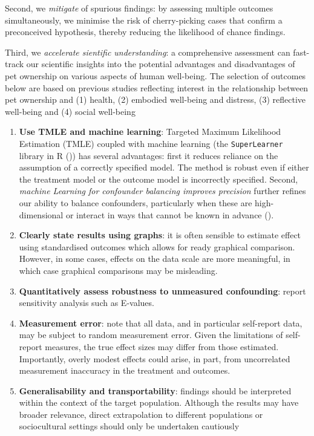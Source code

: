 \documentclass[
  singlecolumn]{article}
\begin{document}
Second, we \emph{mitigate} of spurious findings: by assessing multiple
outcomes simultaneously, we minimise the risk of cherry-picking cases
that confirm a preconceived hypothesis, thereby reducing the likelihood
of chance findings.

Third, we \emph{accelerate sientific understanding}: a comprehensive
assessment can fast-track our scientific insights into the potential
advantages and disadvantages of pet ownership on various aspects of
human well-being. The selection of outcomes below are based on previous
studies reflecting interest in the relationship between pet ownership
and (1) health, (2) embodied well-being and distress, (3) reflective
well-being and (4) social well-being

\begin{enumerate}
\def\labelenumi{\arabic{enumi}.}
\setcounter{enumi}{8}
\item
  \textbf{Use TMLE and machine learning}: Targeted Maximum Likelihood
  Estimation (TMLE) coupled with machine learning (the
  \texttt{SuperLearner} library in R ()) has several advantages: first it reduces
  reliance on the assumption of a correctly specified model. The method
  is robust even if either the treatment model or the outcome model is
  incorrectly specified. Second, \emph{machine Learning for confounder
  balancing improves precision} further refines our ability to balance
  confounders, particularly when these are high-dimensional or interact
  in ways that cannot be known in advance
  ().
\item
  \textbf{Clearly state results using graphs}: it is often sensible to
  estimate effect using standardised outcomes which allows for ready
  graphical comparison. However, in some cases, effects on the data
  scale are more meaningful, in which case graphical comparisons may be
  misleading.
\item
  \textbf{Quantitatively assess robustness to unmeasured confounding}:
  report sensitivity analysis such as E-values.
\item
  \textbf{Measurement error}: note that all data, and in particular
  self-report data, may be subject to random measurement error. Given
  the limitations of self-report measures, the true effect sizes may
  differ from those estimated. Importantly, overly modest effects could
  arise, in part, from uncorrelated measurement inaccuracy in the
  treatment and outcomes.
\item
  \textbf{Generalisability and transportability}: findings should be
  interpreted within the context of the target population. Although the
  results may have broader relevance, direct extrapolation to different
  populations or sociocultural settings should only be undertaken
  cautiously
\end{enumerate}
\end{document}

